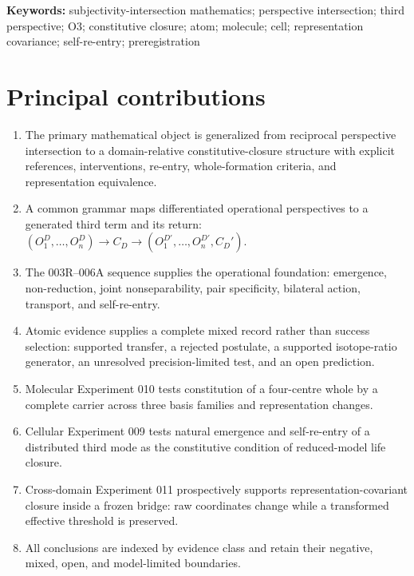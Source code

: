 \documentclass[11pt,a4paper]{article}
\begin{document}
\noindent\textbf{Keywords:} subjectivity-intersection mathematics; perspective intersection; third perspective; O3; constitutive closure; atom; molecule; cell; representation covariance; self-re-entry; preregistration

\section*{Principal contributions}
{\small
\begin{enumerate}[itemsep=0.1em,topsep=0.25em]
  \item The primary mathematical object is generalized from reciprocal perspective intersection to a domain-relative constitutive-closure structure with explicit references, interventions, re-entry, whole-formation criteria, and representation equivalence.
  \item A common grammar maps differentiated operational perspectives to a generated third term and its return: $(O_1^D,\ldots,O_n^D)\rightarrow C_D\rightarrow(O_1^{D\prime},\ldots,O_n^{D\prime},C_D')$.
  \item The 003R--006A sequence supplies the operational foundation: emergence, non-reduction, joint nonseparability, pair specificity, bilateral action, transport, and self-re-entry.
  \item Atomic evidence supplies a complete mixed record rather than success selection: supported transfer, a rejected postulate, a supported isotope-ratio generator, an unresolved precision-limited test, and an open prediction.
  \item Molecular Experiment 010 tests constitution of a four-centre whole by a complete carrier across three basis families and representation changes.
  \item Cellular Experiment 009 tests natural emergence and self-re-entry of a distributed third mode as the constitutive condition of reduced-model life closure.
  \item Cross-domain Experiment 011 prospectively supports representation-covariant closure inside a frozen bridge: raw coordinates change while a transformed effective threshold is preserved.
  \item All conclusions are indexed by evidence class and retain their negative, mixed, open, and model-limited boundaries.
\end{enumerate}
}

\vspace{1.2em}
{\small
\setlength{\parskip}{0pt}
\tableofcontents
}
\clearpage
\end{document}
